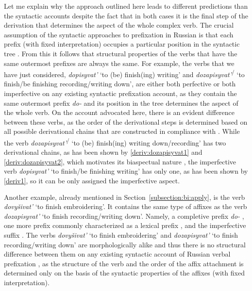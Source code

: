 Let me explain why the approach outlined here leads to different predictions than the syntactic accounts despite the fact that in both cases it is the final step of the derivation that determines the aspect of the whole complex verb. The crucial assumption of the syntactic approaches to prefixation  in Russian is that each prefix (with fixed interpretation) occupies a particular position in the syntactic tree . From this it follows that structural properties of the verbs that have the same outermost prefixes are always the same. For example, the verbs that we have just considered, \textit{dopisyvat'}\textsuperscript{\IPF} `to (be) finish(ing) writing' and \textit{dozapisyvat'}\textsuperscript{\IPF\slash\PF} `to finish/be finishing recording/writing down', are either both perfective or both imperfective on any existing syntactic prefixation  account, as they contain the same outermost prefix \textit{do-}   and its position in the tree determines the aspect of the whole verb. On the account advocated here, there is an evident difference between these verbs, as the order of the derivational steps is determined based on all possible derivational chains that are constructed in compliance with . While the verb \textit{dozapisyvat'}\textsuperscript{\IPF\slash\PF} `to (be) finish(ing) writing down/recording' has two derivational chains, as has been shown by \ref{deriv:dozapisyvat1} and \ref{deriv:dozapisyvat2}, which motivates its biaspectual nature , the imperfective verb  \textit{dopisyvat'}\textsuperscript{\IPF} `to finish/be finishing writing' has only one, as has been shown by \ref{deriv1}, so it can be only assigned the imperfective aspect.

Another example, already mentioned in Section~\ref{subsection:bi:apply}, is the verb \textit{dovy\v{s}ivat'} `to finish embroidering'. It contains the same type of affixes as the verb \textit{dozapisyvat'} `to finish recording/writing down'. Namely, a completive  prefix \textit{do-}  , one more prefix commonly characterized as a lexical prefix , and the imperfective suffix  . The verbs \textit{dovy\v{s}ivat'} `to finish embroidering' and \textit{dozapisyvat'} `to finish recording/writing down' are morphologically alike and thus there is no structural difference between them on any existing syntactic account of  Russian verbal prefixation , as the structure of the verb and the order of the affix attachment is determined only on the basis of the syntactic properties of the affixes (with fixed interpretation).
 
